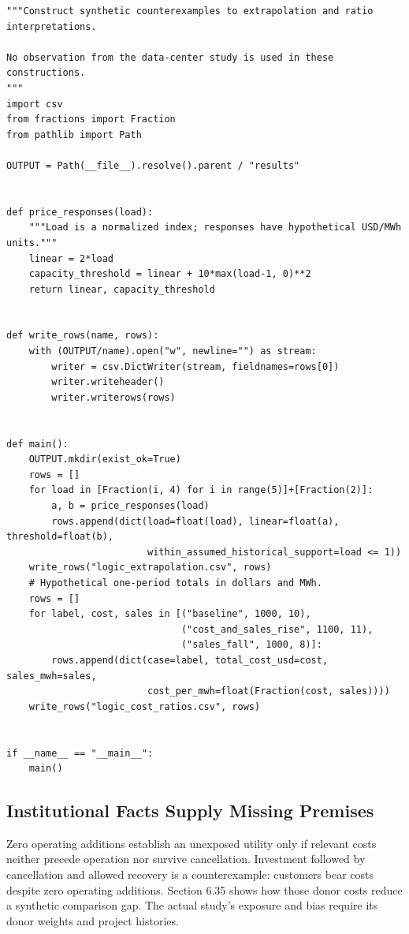 \begin{Verbatim}[breaklines,breakanywhere,fontsize=\small]
"""Construct synthetic counterexamples to extrapolation and ratio interpretations.

No observation from the data-center study is used in these constructions.
"""
import csv
from fractions import Fraction
from pathlib import Path

OUTPUT = Path(__file__).resolve().parent / "results"


def price_responses(load):
    """Load is a normalized index; responses have hypothetical USD/MWh units."""
    linear = 2*load
    capacity_threshold = linear + 10*max(load-1, 0)**2
    return linear, capacity_threshold


def write_rows(name, rows):
    with (OUTPUT/name).open("w", newline="") as stream:
        writer = csv.DictWriter(stream, fieldnames=rows[0])
        writer.writeheader()
        writer.writerows(rows)


def main():
    OUTPUT.mkdir(exist_ok=True)
    rows = []
    for load in [Fraction(i, 4) for i in range(5)]+[Fraction(2)]:
        a, b = price_responses(load)
        rows.append(dict(load=float(load), linear=float(a), threshold=float(b),
                         within_assumed_historical_support=load <= 1))
    write_rows("logic_extrapolation.csv", rows)
    # Hypothetical one-period totals in dollars and MWh.
    rows = []
    for label, cost, sales in [("baseline", 1000, 10),
                               ("cost_and_sales_rise", 1100, 11),
                               ("sales_fall", 1000, 8)]:
        rows.append(dict(case=label, total_cost_usd=cost, sales_mwh=sales,
                         cost_per_mwh=float(Fraction(cost, sales))))
    write_rows("logic_cost_ratios.csv", rows)


if __name__ == "__main__":
    main()
\end{Verbatim}

\hypertarget{M09-institutional-facts-supply-missing-premises}{%
\subsection{Institutional Facts Supply Missing
Premises}\label{M09-institutional-facts-supply-missing-premises}}

\noindent \noindent Zero operating additions establish an unexposed utility only
if relevant costs neither precede operation nor survive cancellation.
Investment followed by cancellation and allowed recovery is a
counterexample: customers bear costs despite zero operating additions.
Section 6.35 shows how those donor costs reduce a synthetic comparison
gap. The actual study's exposure and bias require its donor weights and
project histories.

